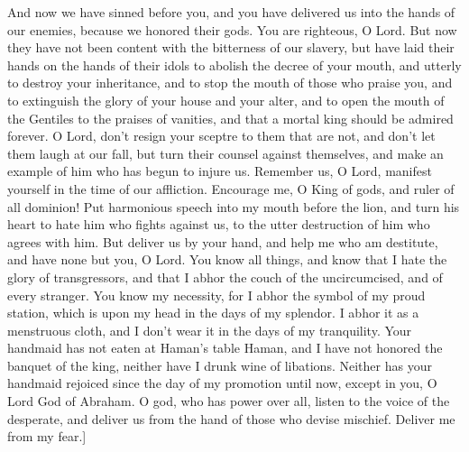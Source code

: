 {And now we have sinned before you, and you have delivered us into the hands of our enemies,
because we honored their gods. You are righteous, O Lord.
But now they have not been content with the bitterness of our slavery, but have laid their hands on the hands of their idols
to abolish the decree of your mouth, and utterly to destroy your inheritance, and to stop the mouth of those who praise you, and to extinguish the glory of your house and your alter,
and to open the mouth of the Gentiles to
{} the
 praises of vanities, and that a mortal king should be admired forever.
O Lord, don’t resign your sceptre to them that are not, and don’t let them laugh at our fall, but turn their counsel against themselves, and make an example of him who has
 begun to injure us.
Remember us, O Lord, manifest yourself in the time of our affliction. Encourage me, O King of gods, and ruler of all dominion!
Put harmonious speech into my mouth before the lion, and turn his heart to hate him who fights against us, to the utter destruction of him who agrees with him.
But deliver us by your hand, and help me who am destitute, and have none but you, O Lord.
You know all things, and know that I hate the
glory of transgressors, and that I abhor the couch of the uncircumcised, and of every stranger.
You know my necessity, for I abhor the symbol of my proud station, which is upon my head in the days of my
 splendor. I abhor it as a menstruous cloth, and I don’t wear it in the days of my tranquility.
Your handmaid has not eaten at Haman’s table Haman, and I have not honored the banquet of the king, neither have I drunk wine of libations.
Neither has your handmaid rejoiced since the day of my promotion until now, except in you, O Lord God of Abraham.
O god, who has power over all, listen to the voice of the desperate, and deliver us from the hand of those who devise mischief. Deliver me from my fear.]

}
